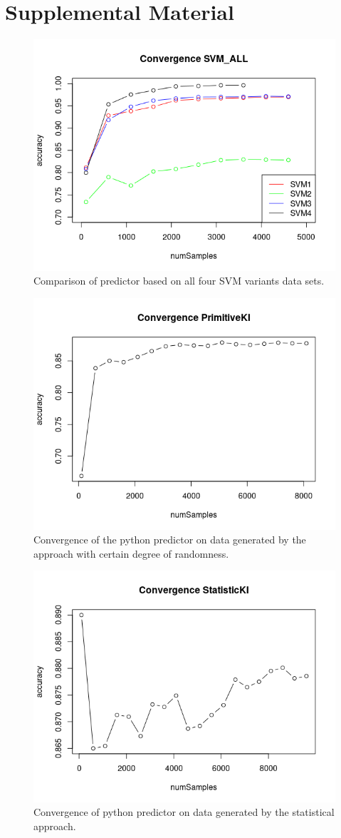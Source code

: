 \documentclass[11pt]{article}
\begin{document}
\FloatBarrier
\section{Supplemental Material}

\begin{figure}[H]
	\centering
	\includegraphics[width=.45\textwidth]{../testdata/convergence_all.png}
	\caption{Comparison of predictor based on all four SVM variants data sets.}
	\label{fig:conv_svmall}
\end{figure}

\begin{figure}[H]
	\centering
	\includegraphics[width=.45\textwidth]{../testdata/conv_prim.png}
	\caption{Convergence of the python predictor on data generated by the approach with certain degree of randomness.}
	\label{fig:conv_prim}
\end{figure}
\begin{figure}[H]
	\centering
	\includegraphics[width=.45\textwidth]{../testdata/conv_stat.png}
	\caption{Convergence of python predictor on data generated by the statistical approach.}
	\label{fig:conv_stat}
\end{figure}
\end{document}
